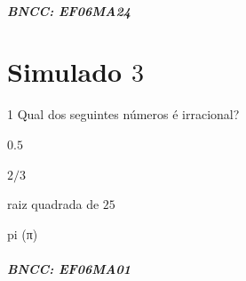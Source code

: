 \paragraph{BNCC: EF06MA24 }


\chapter{Simulado $3$}

\num{1}  Qual dos seguintes números é irracional?

\begin{escolha}
\item $0.5$
\item $2/3$
\item raiz quadrada de $25$
\item pi (π)
\end{escolha}

\paragraph{BNCC: EF06MA01 }


